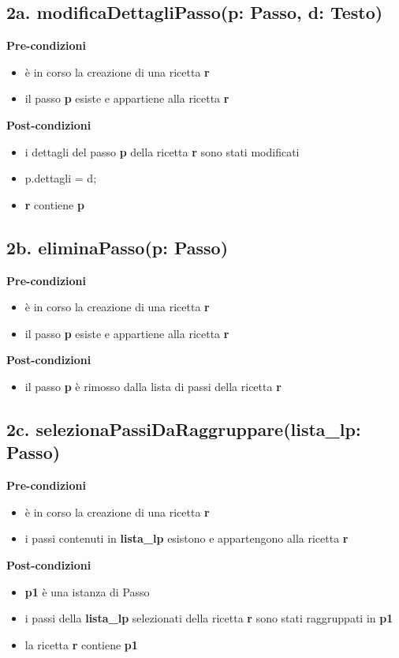 \documentclass[12pt]{extarticle}
\begin{document}
\subsection*{2a. modificaDettagliPasso(p: Passo, d: Testo)}

\textbf{Pre-condizioni}
\begin{itemize}
  \item è in corso la creazione di una ricetta  \textbf{r}
  \item il passo  \textbf{p} esiste e appartiene alla ricetta \textbf{r}
\end{itemize}
\textbf{Post-condizioni}
\begin{itemize}
  \item i dettagli del passo \textbf{p} della ricetta \textbf{r} sono stati modificati
  \item p.dettagli = d;
  \item  \textbf{r} contiene  \textbf{p}
\end{itemize}

\subsection*{2b. eliminaPasso(p: Passo)}

\textbf{Pre-condizioni}
\begin{itemize}
  \item è in corso la creazione di una ricetta  \textbf{r}
  \item il passo  \textbf{p} esiste e appartiene alla ricetta \textbf{r}
\end{itemize}
\textbf{Post-condizioni}
\begin{itemize}
  \item il passo  \textbf{p} è rimosso dalla lista di passi della ricetta \textbf{r}
\end{itemize}

\subsection*{2c. selezionaPassiDaRaggruppare(lista\_lp: Passo)}

\textbf{Pre-condizioni}
\begin{itemize}
  \item è in corso la creazione di una ricetta  \textbf{r}
  \item i passi contenuti in \textbf{lista\_lp} esistono e appartengono alla ricetta \textbf{r}
\end{itemize}
\textbf{Post-condizioni}
\begin{itemize}
  \item \textbf{p1} è una istanza di Passo
  \item i passi della \textbf{lista\_lp} selezionati della ricetta  \textbf{r} sono stati raggruppati in \textbf{p1}
  \item  la ricetta \textbf{r} contiene  \textbf{p1}
\end{itemize}
\end{document}
